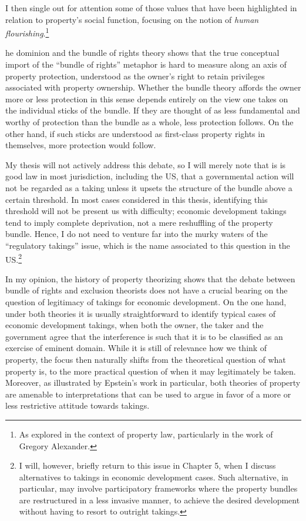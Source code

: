 I then single out for attention some of those values that have been highlighted in relation to property's social function, focusing on the notion of {\it human flourishing}.\footnote{As explored in the context of property law, particularly in the work of Gregory Alexander.}

he dominion and the bundle of rights theory shows that the true conceptual import of the ``bundle of rights'' metaphor is hard to measure along an axis of property protection, understood as the owner's right to retain privileges associated with property ownership. Whether the bundle theory affords the owner more or less protection in this sense depends entirely on the view one takes on the individual sticks of the bundle. If they are thought of as less fundamental and worthy of protection than the bundle as a whole, less protection follows. On the other hand, if such sticks are understood as first-class property rights in themselves, more protection would follow.

My thesis will not actively address this debate, so I will merely note that is is good law in most jurisdiction, including the US, that a governmental action will not be regarded as a taking unless it upsets the structure of the bundle above a certain threshold. In most cases considered in this thesis, identifying this threshold will not be present us with difficulty; economic development takings tend to imply complete deprivation, not a mere reshuffling of the property bundle. Hence, I do not need to venture far into the murky waters of the ``regulatory takings'' issue, which is the name associated to this question in the US.\footnote{I will, however, briefly return to this issue in Chapter 5, when I discuss alternatives to takings in economic development cases. Such alternative, in particular, may involve participatory frameworks where the property bundles are restructured in a less invasive manner, to achieve the desired development without having to resort to outright takings.}

In my opinion, the history of property theorizing shows that the debate between bundle of rights and exclusion theorists does not have a crucial bearing on the question of legitimacy of takings for economic development. On the one hand, under both theories it is usually straightforward to identify typical cases of economic development takings, when both the owner, the taker and the government agree that the interference is such that it is to be classified as an exercise of eminent domain. While it is still of relevance how we think of property, the focus then naturally shifts from the theoretical question of what property is, to the more practical question of when it may legitimately be taken. Moreover, as illustrated by Epstein's work in particular, both theories of property are amenable to interpretations that can be used to argue in favor of a more or less restrictive attitude towards takings. 

